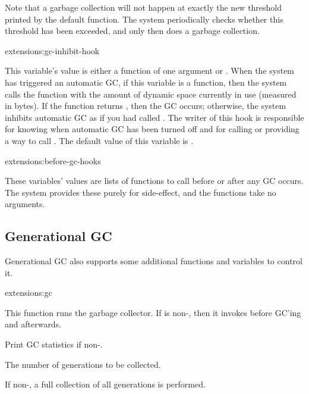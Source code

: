 Note that a garbage collection will not happen at exactly the new
threshold printed by the default 
function.  The system periodically checks whether this threshold has
been exceeded, and only then does a garbage collection.

\begin{defvar}{extensions:}{gc-inhibit-hook}
  
  This variable's value is either a function of one argument or \nil.
  When the system has triggered an automatic GC, if this variable is a
  function, then the system calls the function with the amount of
  dynamic space currently in use (measured in bytes).  If the function
  returns \nil, then the GC occurs; otherwise, the system inhibits
  automatic GC as if you had called .  The writer of
  this hook is responsible for knowing when automatic GC has been
  turned off and for calling or providing a way to call
  .  The default value of this variable is \nil.
\end{defvar}

\begin{defvar}{extensions:}{before-gc-hooks}
  
  These variables' values are lists of functions to call before or
  after any GC occurs.  The system provides these purely for
  side-effect, and the functions take no arguments.
\end{defvar}

\subsection{Generational GC}
Generational GC also supports some additional functions and variables
to control it.

\begin{defun}[-gencgc]{extensions:}{gc}{}
  
  This function runs the garbage collector.  If
   is non-\nil, then it invokes
   before GC'ing and
   afterwards.

  \begin{Lentry}
  \item[\code{verbose}] Print GC statistics if non-.
  \item[\code{gen}] The number of generations to be collected.
  \item[\code{full}] If non-, a full collection of all
    generations is performed.
  \end{Lentry}
\end{defun}

